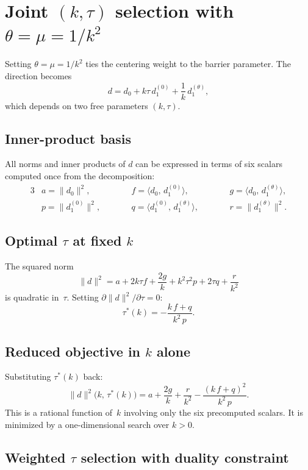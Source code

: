 \documentclass{article}
\begin{document}
\section{Joint $(k,\tau)$ selection with $\theta = \mu = 1/k^2$}

Setting $\theta = \mu = 1/k^2$ ties the centering weight to the barrier
parameter.  The direction becomes
\[
  d = d_0 + k\tau\,d_1^{(0)} + \frac{1}{k}\,d_1^{(\theta)},
\]
which depends on two free parameters $(k, \tau)$.

\subsection{Inner-product basis}

All norms and inner products of $d$ can be expressed in terms of
six scalars computed once from the decomposition:
\begin{alignat*}{3}
  &a = \|d_0\|^2, &\qquad
  &f = \langle d_0,\, d_1^{(0)}\rangle, &\qquad
  &g = \langle d_0,\, d_1^{(\theta)}\rangle, \\
  &p = \|d_1^{(0)}\|^2, &\qquad
  &q = \langle d_1^{(0)},\, d_1^{(\theta)}\rangle, &\qquad
  &r = \|d_1^{(\theta)}\|^2.
\end{alignat*}

\subsection{Optimal $\tau$ at fixed $k$}

The squared norm
\[
  \|d\|^2 = a + 2k\tau f + \frac{2g}{k}
            + k^2\tau^2 p + 2\tau q + \frac{r}{k^2}
\]
is quadratic in~$\tau$.  Setting $\partial\|d\|^2/\partial\tau = 0$:
\[
  \boxed{\tau^*(k) = -\frac{k\,f + q}{k^2\,p}.}
\]

\subsection{Reduced objective in $k$ alone}

Substituting $\tau^*(k)$ back:
\[
  \|d\|^2\bigl(k,\,\tau^*(k)\bigr)
  = a + \frac{2g}{k} + \frac{r}{k^2}
    - \frac{(k\,f + q)^2}{k^2\,p}.
\]
This is a rational function of~$k$ involving only the six precomputed
scalars.  It is minimized by a one-dimensional search over $k > 0$.

\subsection{Weighted $\tau$ selection with duality constraint}
\end{document}
